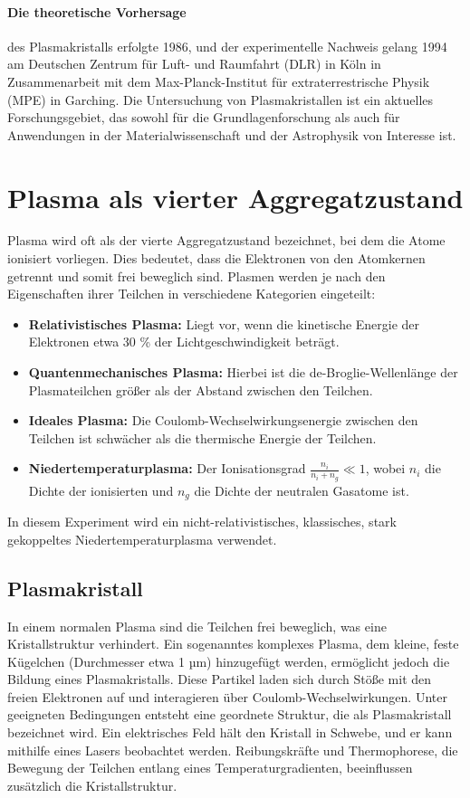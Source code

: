 \documentclass[12pt,a4paper,ngerman]{article}
\begin{document}
\paragraph{Die theoretische Vorhersage} des Plasmakristalls erfolgte 1986, und der experimentelle Nachweis gelang 1994 am Deutschen Zentrum für Luft- und Raumfahrt (DLR) in Köln in Zusammenarbeit mit dem Max-Planck-Institut für extraterrestrische Physik (MPE) in Garching. Die Untersuchung von Plasmakristallen ist ein aktuelles Forschungsgebiet, das sowohl für die Grundlagenforschung als auch für Anwendungen in der Materialwissenschaft und der Astrophysik von Interesse ist.

\section{Plasma als vierter Aggregatzustand}
Plasma wird oft als der vierte Aggregatzustand bezeichnet, bei dem die Atome ionisiert vorliegen. Dies bedeutet, dass die Elektronen von den Atomkernen getrennt und somit frei beweglich sind. Plasmen werden je nach den Eigenschaften ihrer Teilchen in verschiedene Kategorien eingeteilt:

\begin{itemize}
    \item \textbf{Relativistisches Plasma:} Liegt vor, wenn die kinetische Energie der Elektronen etwa 30 \% der Lichtgeschwindigkeit beträgt.
    \item \textbf{Quantenmechanisches Plasma:} Hierbei ist die de-Broglie-Wellenlänge der Plasmateilchen größer als der Abstand zwischen den Teilchen.
    \item \textbf{Ideales Plasma:} Die Coulomb-Wechselwirkungsenergie zwischen den Teilchen ist schwächer als die thermische Energie der Teilchen.
    \item \textbf{Niedertemperaturplasma:} Der Ionisationsgrad \( \frac{n_i}{n_i + n_g} \ll 1 \), wobei \( n_i \) die Dichte der ionisierten und \( n_g \) die Dichte der neutralen Gasatome ist.
\end{itemize}

In diesem Experiment wird ein nicht-relativistisches, klassisches, stark gekoppeltes Niedertemperaturplasma verwendet.

\subsection{Plasmakristall}
In einem normalen Plasma sind die Teilchen frei beweglich, was eine Kristallstruktur verhindert. Ein sogenanntes komplexes Plasma, dem kleine, feste Kügelchen (Durchmesser etwa 1 µm) hinzugefügt werden, ermöglicht jedoch die Bildung eines Plasmakristalls. Diese Partikel laden sich durch Stöße mit den freien Elektronen auf und interagieren über Coulomb-Wechselwirkungen. Unter geeigneten Bedingungen entsteht eine geordnete Struktur, die als Plasmakristall bezeichnet wird. Ein elektrisches Feld hält den Kristall in Schwebe, und er kann mithilfe eines Lasers beobachtet werden. Reibungskräfte und Thermophorese, die Bewegung der Teilchen entlang eines Temperaturgradienten, beeinflussen zusätzlich die Kristallstruktur.
\end{document}
